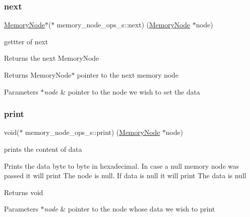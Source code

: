 \subsubsection{\texorpdfstring{next}{next}}
{\footnotesize\ttfamily \hyperlink{structmemory__node__s}{Memory\+Node}$\ast$($\ast$ memory\+\_\+node\+\_\+ops\+\_\+s\+::next) (\hyperlink{structmemory__node__s}{Memory\+Node} $\ast$node)}



gettter of next 

Returns the next Memory\+Node

\begin{DoxyReturn}{Returns}
Memory\+Node$\ast$ pointer to the next memory node 
\end{DoxyReturn}

\begin{DoxyParams}{Parameters}
{\em $\ast$node} & pointer to the node we wish to set the data \\
\hline
\end{DoxyParams}
\mbox{\label{structmemory__node__ops__s_ad5a051d70388c508b600399b0cca0973}} 
\subsubsection{\texorpdfstring{print}{print}}
{\footnotesize\ttfamily void($\ast$ memory\+\_\+node\+\_\+ops\+\_\+s\+::print) (\hyperlink{structmemory__node__s}{Memory\+Node} $\ast$node)}



prints the content of data 

Prints the data byte to byte in hexadecimal. In case a null memory node was passed it will print The node is null. If data is null it will print The data is null \begin{DoxyReturn}{Returns}
void 
\end{DoxyReturn}

\begin{DoxyParams}{Parameters}
{\em $\ast$node} & pointer to the node whose data we wish to print \\
\hline
\end{DoxyParams}
\mbox{\label{structmemory__node__ops__s_a8a9d4846b4b5628d9994467f6f492b81}} 
